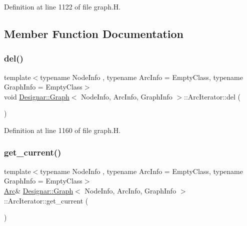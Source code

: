 Definition at line 1122 of file graph.\+H.



\subsection{Member Function Documentation}
\mbox{\label{class_designar_1_1_graph_1_1_arc_iterator_a6375bb0513856b2b20dffbfb2496082e}} 
\subsubsection{\texorpdfstring{del()}{del()}}
{\footnotesize\ttfamily template$<$typename Node\+Info , typename Arc\+Info  = Empty\+Class, typename Graph\+Info  = Empty\+Class$>$ \\
void \hyperlink{class_designar_1_1_graph}{Designar\+::\+Graph}$<$ Node\+Info, Arc\+Info, Graph\+Info $>$\+::Arc\+Iterator\+::del (\begin{DoxyParamCaption}{ }\end{DoxyParamCaption})\hspace{0.3cm}{\ttfamily [inline]}}



Definition at line 1160 of file graph.\+H.

\mbox{\label{class_designar_1_1_graph_1_1_arc_iterator_a4915ccaef38293e9dc449e7dba3965ec}} 
\subsubsection{\texorpdfstring{get\+\_\+current()}{get\_current()}\hspace{0.1cm}{\footnotesize\ttfamily [1/2]}}
{\footnotesize\ttfamily template$<$typename Node\+Info , typename Arc\+Info  = Empty\+Class, typename Graph\+Info  = Empty\+Class$>$ \\
\hyperlink{class_designar_1_1_graph_a74c730ef4ce2d20f998d72bd25c2b5bf}{Arc}\& \hyperlink{class_designar_1_1_graph}{Designar\+::\+Graph}$<$ Node\+Info, Arc\+Info, Graph\+Info $>$\+::Arc\+Iterator\+::get\+\_\+current (\begin{DoxyParamCaption}{ }\end{DoxyParamCaption})\hspace{0.3cm}{\ttfamily [inline]}}



